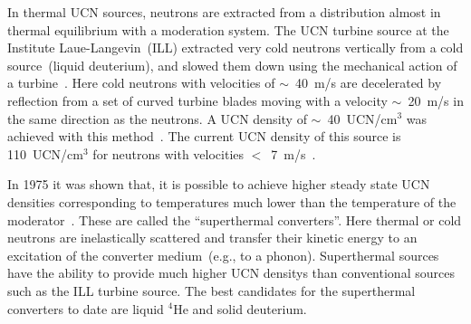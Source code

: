 In thermal UCN sources, neutrons are extracted from a distribution
almost in thermal equilibrium with a moderation system. The UCN
turbine source at the Institute Laue-Langevin~(ILL) extracted very
cold neutrons vertically from a cold source~(liquid deuterium), and
slowed them down using the mechanical action of a
turbine~\cite{Steyerl1986,Steyerl1975}. Here cold neutrons with
velocities of $\sim$~40~m/s are decelerated by reflection from a set
of curved turbine blades moving with a velocity $\sim$~20~m/s in the
same direction as the neutrons. A UCN density of $\sim$~40~UCN/cm$^3$
was achieved with this method~\cite{ucnbook,Albert_talk}. The current
UCN density of this source is 110~UCN/cm$^3$ for neutrons with
velocities $<$~7~m/s~\cite{Steyerl1986}.


In 1975 it was shown that, it is possible to achieve higher steady
state UCN densities corresponding to temperatures much lower than the
temperature of the moderator~\cite{Golub75}. These are called the
``superthermal converters''. Here thermal or cold neutrons are
inelastically scattered and transfer their kinetic energy to an
excitation of the converter medium~(e.g., to a phonon).  Superthermal
sources have the ability to provide much higher UCN densitys than
conventional sources such as the ILL turbine source. The best
candidates for the superthermal converters to date are liquid $^4$He
and solid deuterium.




